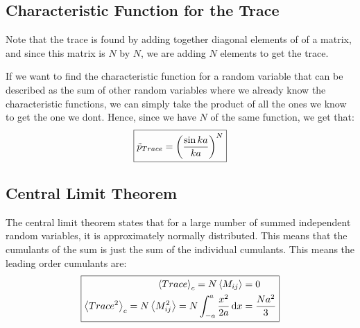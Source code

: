 \documentclass[12pt]{article}
\begin{document}
\subsection{Characteristic Function for the Trace}
Note that the trace is found by adding together diagonal elements of of a matrix, and since this matrix is $N$ by $N$, we are adding $N$ elements to get the trace.

If we want to find the characteristic function for a random variable that can be described as the sum of other random variables where we already know the characteristic functions, we can simply take the product of all the ones we know to get the one we dont. Hence, since we have $N$ of the same function, we get that:
\begin{align}
  \boxed{\tilde{p}_{Trace}=\qty(\frac{\sin ka}{ka})^N}
\end{align}
\subsection{Central Limit Theorem}
The central limit theorem states that for a large number of summed independent random variables, it is approximately normally distributed. This means that the cumulants of the sum is just the sum of the individual cumulants. This means the leading order cumulants are:
\begin{equation}
  \boxed{
    \begin{aligned}
      \ev{Trace}_c=N\ev{M_{ij}}&=0\\
      \ev{Trace^2}_c=N\ev{M_{ij}^2}=N\int_{-a}^a\frac{x^2}{2a}\dd{x}&=
      \frac{Na^2}{3}
    \end{aligned}
  }
\end{equation}
\end{document}
